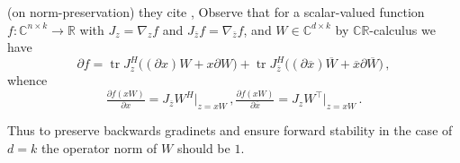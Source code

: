 (on norm-preservation)
they cite \citep{arjovsky_unitary_2016}, 
Observe that for a scalar-valued function $f \colon \mathbb{C}^{n\times k} \to \mathbb{R}$
with $J_z = \nabla_z f$ and $J_{\overline{z}} f =  \nabla_{\overline{z}} f$, and
$W \in \mathbb{C}^{d \times k}$ by $\mathbb{CR}$-calculus we have
$$
\partial f
    = \mathop{tr} J_z^H \bigl((\partial x) W + x \partial W\bigr)
    + \mathop{tr} J_{\overline{z}}^H \bigl(
        (\partial \overline{x}) \overline{W}
        + \overline{x} \partial \overline{W}
    \bigr)
    \,, $$
whence
$$ 
\tfrac{\partial f(x W)}{\partial x}
    = J_{\overline{z}} W^H \Big\vert_{z = xW}
    \,, \tfrac{\partial f(x W)}{\partial \overline{x}}
        = J_{z} W^\top \Big\vert_{z = xW}
    \,. $$

Thus to preserve backwards gradinets and ensure forward stability in the case of $d=k$
the operator norm of $W$ should be $1$.